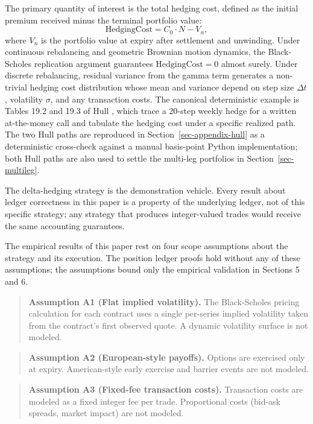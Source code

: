 \documentclass[
  11pt,
  letterpaper,
  DIV=12,
  numbers=noendperiod]{scrartcl}
\numberwithin{equation}{section}
\numberwithin{figure}{section}
\numberwithin{table}{section}
\begin{document}
The primary quantity of interest is the total hedging cost, defined as
the initial premium received minus the terminal portfolio value: \[
\text{HedgingCost} = C_0 \cdot N - V_n,
\] where \(V_n\) is the portfolio value at expiry after settlement and
unwinding. Under continuous rebalancing and geometric Brownian motion
dynamics, the Black-Scholes replication argument guarantees
\(\text{HedgingCost} = 0\) almost surely. Under discrete rebalancing,
residual variance from the gamma term generates a non-trivial hedging
cost distribution whose mean and variance depend on step size \(\Delta
t\), volatility \(\sigma\), and any transaction costs. The canonical
deterministic example is Tables 19.2 and 19.3 of Hull
, which trace a 20-step weekly hedge for
a written at-the-money call and tabulate the hedging cost under a
specific realized path. The two Hull paths are reproduced in
Section~\ref{sec-appendix-hull} as a deterministic cross-check against a
manual basis-point Python implementation; both Hull paths are also used
to settle the multi-leg portfolios in Section~\ref{sec-multileg}.

The delta-hedging strategy is the demonstration vehicle. Every result
about ledger correctness in this paper is a property of the underlying
ledger, not of this specific strategy; any strategy that produces
integer-valued trades would receive the same accounting guarantees.

The empirical results of this paper rest on four scope assumptions about
the strategy and its execution. The position ledger proofs hold without
any of these assumptions; the assumptions bound only the empirical
validation in Sections 5 and 6.

\begin{quote}
\textbf{Assumption A1 (Flat implied volatility).} The Black-Scholes
pricing calculation for each contract uses a single per-series implied
volatility taken from the contract's first observed quote. A dynamic
volatility surface is not modeled.
\end{quote}

\begin{quote}
\textbf{Assumption A2 (European-style payoffs).} Options are exercised
only at expiry. American-style early exercise and barrier events are not
modeled.
\end{quote}

\begin{quote}
\textbf{Assumption A3 (Fixed-fee transaction costs).} Transaction costs
are modeled as a fixed integer fee per trade. Proportional costs
(bid-ask spreads, market impact) are not modeled.
\end{quote}
\end{document}
